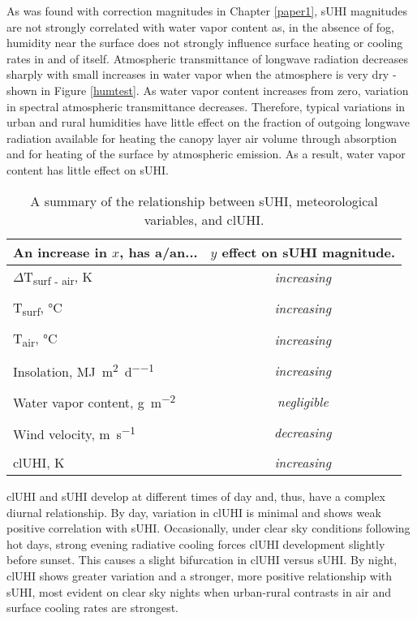 \begin{bibunit}
As was found with correction magnitudes in Chapter \ref{paper1}, sUHI magnitudes are not strongly correlated with water vapor content as, in the absence of fog, humidity near the surface does not strongly influence surface heating or cooling rates in and of itself. Atmospheric transmittance of longwave radiation decreases sharply with small increases in water vapor when the atmosphere is very dry - shown in Figure \ref{humtest}. As water vapor content increases from zero, variation in spectral atmospheric transmittance decreases. Therefore, typical variations in urban and rural humidities have little effect on the fraction of outgoing longwave radiation available for heating the canopy layer air volume through absorption and for heating of the surface by atmospheric emission. As a result, water vapor content has little effect on sUHI. 

\begin{table}[H]
	\centering
	\caption{A summary of the relationship between sUHI, meteorological variables, and clUHI.}
	\label{meteo_cont}
	\begin{tabular}{lc}
		\toprule 
		An increase in $x$, has a/an... & $y$ effect on sUHI magnitude. \\
		\midrule
		$\Delta$T\textsubscript{surf - air}, \si{\kelvin} &\textit{increasing} \\
		&\\
		T\textsubscript{surf}, \si{\degreeCelsius}  & \textit{increasing} \\
		&\\
		T\textsubscript{air}, \si{\degreeCelsius} & \textit{increasing} \\
		&\\
		Insolation, \si{\mega\joule\per\meter\squared\per\day} & \textit{increasing}  \\
		& \\
		Water vapor content, \si{\gram\per\meter\squared} & \textit{negligible} \\
		&\\
		Wind velocity, \si{\meter\per\second} &\textit{decreasing} \\
		&\\
		clUHI, \si{\kelvin} &\textit{increasing} \\
		\bottomrule
	\end{tabular} 
\end{table}

clUHI and sUHI develop at different times of day and, thus, have a complex diurnal relationship. By day, variation in clUHI is minimal and shows weak positive correlation with sUHI. Occasionally, under clear sky conditions following hot days, strong evening radiative cooling forces clUHI development slightly before sunset. This causes a slight bifurcation in clUHI versus sUHI. By night, clUHI shows greater variation and a stronger, more positive relationship with sUHI, most evident on clear sky nights when urban-rural contrasts in air and surface cooling rates are strongest. 


\end{bibunit}

